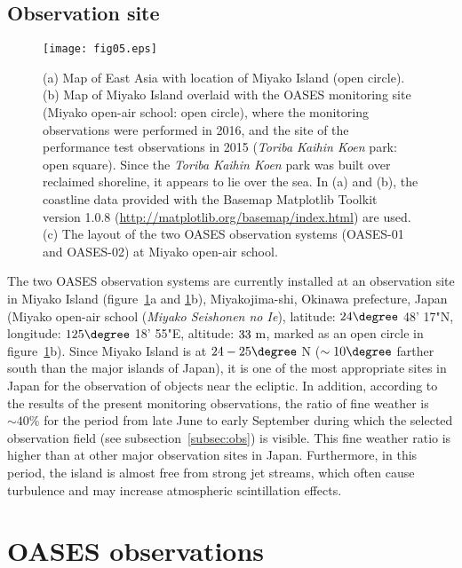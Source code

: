 \documentclass{pasj01}
\newcommand{\void}[1]{}
\renewcommand{\textcolor}{\void}
\begin{document}
\subsection{Observation site}

\begin{figure}[!t]
\begin{center}
   \texttt{[image: fig05.eps]}
   \caption{
   (a) Map of East Asia with location of Miyako Island (open circle).
   (b) Map of Miyako Island overlaid with the OASES monitoring site
   (Miyako open-air school: open circle), 
   where the monitoring observations were performed in 2016, 
   and the site of the performance test observations in 2015
   ({\it Toriba Kaihin Koen} park: open square).
   Since the {\it Toriba Kaihin Koen} park was built over reclaimed shoreline, 
   it appears to lie over the sea. 
   In (a) and (b), the coastline data 
   provided with the Basemap Matplotlib Toolkit version 1.0.8
   (\url{http://matplotlib.org/basemap/index.html}) are used.
   (c) The layout of the two OASES observation systems (OASES-01 and OASES-02) at Miyako open-air school.}
   \label{fig34}
 \end{center}
\end{figure}


The two OASES observation systems are currently installed at an
observation site in Miyako Island (figure~\ref{fig34}a and \ref{fig34}b), Miyakojima-shi, Okinawa prefecture, Japan (Miyako open-air school 
\textcolor{red}{
({\it Miyako Seishonen no Ie}),
}
 latitude: $24\degree$ 48' 17"N, longitude: $125\degree$ 18' 55"E, altitude: $33 \ {\rm m}$, 
marked as an open circle in figure~\ref{fig34}b).
Since Miyako Island is at $24-25\degree$ N
($\sim 10\degree$ farther south than the major islands of Japan), 
it is one of the most appropriate sites in Japan for the observation of objects near the ecliptic.
In addition, according to the results of the present monitoring observations,
the ratio of fine weather is $\sim 40$\% for the period from late June to early September 
during which the selected observation field (see subsection~\ref{subsec:obs}) is visible. 
This fine weather ratio is higher than at other major observation sites in Japan.
Furthermore, in this period, the island is almost free from strong jet streams, 
which often cause turbulence and may increase atmospheric scintillation effects.


\section{OASES observations}
\end{document}
